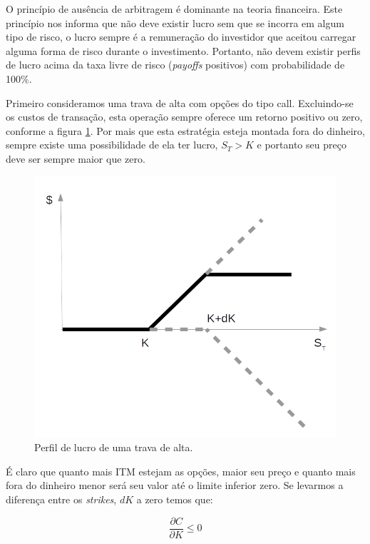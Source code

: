 \documentclass[]{book}
\theoremstyle{definition}
\theoremstyle{definition}
\theoremstyle{definition}
\theoremstyle{remark}
\begin{document}
O princípio de ausência de arbitragem é dominante na teoria financeira. Este princípio nos informa que não deve existir lucro sem que se incorra em algum tipo de risco, o lucro sempre é a remuneração do investidor que aceitou carregar alguma forma de risco durante o investimento. Portanto, não devem existir perfis de lucro acima da taxa livre de risco (\emph{payoffs} positivos) com probabilidade de 100\%.

Primeiro consideramos uma trava de alta com opções do tipo call. Excluindo-se os custos de transação, esta operação sempre oferece um retorno positivo ou zero, conforme a figura \ref{fig:trava-alta}. Por mais que esta estratégia esteja montada fora do dinheiro, sempre existe uma possibilidade de ela ter lucro, \(S_T>K\) e portanto seu preço deve ser sempre maior que zero.

\begin{figure}
\centering
\includegraphics{./images/trava_alta.png}
\caption{\label{fig:trava-alta}Perfil de lucro de uma trava de alta.}
\end{figure}

É claro que quanto mais ITM estejam as opções, maior seu preço e quanto mais fora do dinheiro menor será seu valor até o limite inferior zero. Se levarmos a diferença entre os \emph{strikes}, \(dK\) a zero temos que:

\begin{equation}
\frac{\partial C}{\partial K}\leq 0
\end{equation}
\end{document}
